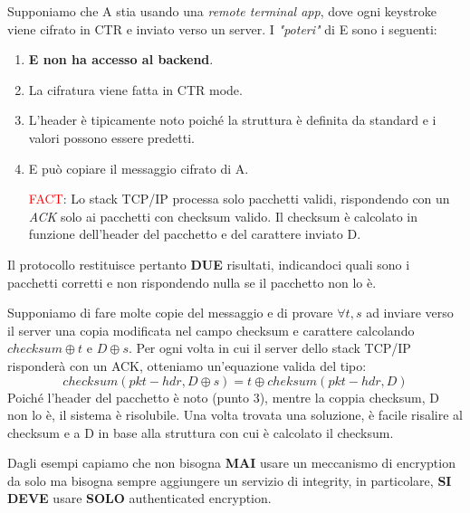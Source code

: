 \begin{example}Supponiamo che A stia usando una \textit{remote terminal app}, dove ogni keystroke viene cifrato in CTR e inviato verso un server. I \textit{"poteri"} di E sono i seguenti:
\begin{enumerate}
    \item \textbf{E non ha accesso al backend}.
    \item La cifratura viene fatta in CTR mode.
    \item L'header è tipicamente noto poiché la struttura è definita da standard e i valori possono essere predetti.
    \item E può copiare il messaggio cifrato di A.
    \item [\textcolor{red}{FACT}:]Lo stack TCP/IP processa solo pacchetti validi, rispondendo con un \textit{ACK} solo ai pacchetti con checksum valido. Il checksum è calcolato in funzione dell'header del pacchetto e del carattere inviato D.
\end{enumerate}
\begin{note}
Il protocollo restituisce pertanto \textbf{DUE} risultati, indicandoci quali sono i pacchetti corretti e non rispondendo nulla se il pacchetto non lo è.
\end{note}
Supponiamo di fare molte copie del messaggio e di provare $\forall{t,s}$ ad inviare verso il server una copia modificata nel campo checksum e carattere calcolando $checksum\oplus{t}$ e $D\oplus{s}$. Per ogni volta in cui il server dello stack TCP/IP risponderà con un ACK, otteniamo un'equazione valida del tipo:
\[checksum(pkt-hdr,D\oplus{s})=t\oplus{cheksum(pkt-hdr, D)}\]
Poiché l'header del pacchetto è noto (punto 3), mentre la coppia {checksum, D} non lo è, il sistema è risolubile. Una volta trovata una soluzione, è facile risalire al checksum e a D in base alla struttura con cui è calcolato il checksum. 
\end{example}
\begin{remark}
Dagli esempi capiamo che non bisogna \textbf{MAI} usare un meccanismo di encryption da solo ma bisogna sempre aggiungere un servizio di integrity, in particolare, \textbf{SI DEVE} usare \textbf{SOLO} authenticated encryption.
\end{remark}
